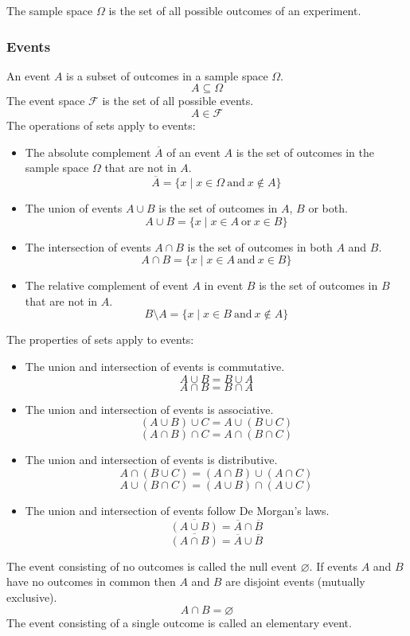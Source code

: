 \documentclass{article}
\begin{document}
The sample space $\Omega$ is the set of all possible outcomes of an experiment.

\subsubsection{Events}

An event $A$ is a subset of outcomes in a sample space $\Omega$.
\[A \subseteq \Omega\]
The event space $\mathcal{F}$ is the set of all possible events.
\[A \in \mathcal{F}\]
The operations of sets apply to events:
\begin{itemize}
\item The absolute complement $\overline{A}$ of an event $A$ is the set of outcomes in the sample space $\Omega$ that are not in $A$.
\[\overline{A}= \{x \mid x \in \Omega \ \mathrm{and} \ x \notin A\} \]
\item The union of events $A \cup B$ is the set of outcomes in $A$, $B$ or both.
\[A \cup B = \{x \mid x \in A \ \mathrm{or} \ x \in B\} \]
\item The intersection of events $A \cap B$ is the set of outcomes in both $A$ and $B$.
\[A \cap B = \{x \mid x \in A \ \mathrm{and} \ x \in B\} \]
\item The relative complement of event $A$ in event $B$ is the set of outcomes in $B$ that are not in $A$.
\[B \setminus A = \{x \mid x \in B \ \mathrm{and} \ x \notin A\}\]
\end{itemize}
The properties of sets apply to events:
\begin{itemize}
\item The union and intersection of events is commutative.
\[A \cup B = B \cup A\]
\[A \cap B = B \cap A\]
\item The union and intersection of events is associative.
\[(A \cup B) \cup C = A \cup (B \cup C)\]
\[(A \cap B) \cap C = A \cap (B \cap C)\]
\item The union and intersection of events is distributive.
\[A \cap (B \cup C) = (A \cap B) \cup (A \cap C)\]
\[A \cup (B \cap C) = (A \cup B) \cap (A \cup C)\]
\item The union and intersection of events follow De Morgan's laws.
\[\overline{(A \cup B)} = \overline{A} \cap \overline{B}\]
\[\overline{(A \cap B)} = \overline{A} \cup \overline{B}\]
\end{itemize}
The event consisting of no outcomes is called the null event $\varnothing$. If events $A$ and $B$ have no outcomes in common then $A$ and $B$ are disjoint events (mutually exclusive).
\[A \cap B = \varnothing \]
The event consisting of a single outcome is called an elementary event.
\end{document}
